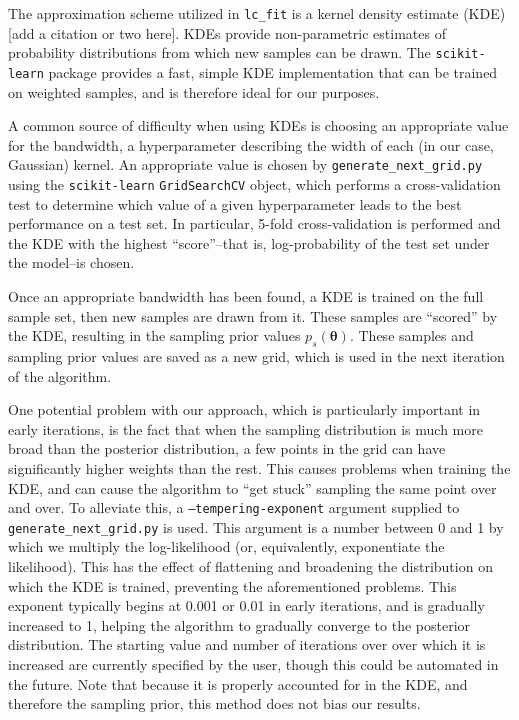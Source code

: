 \documentclass[11pt]{article}
\newcommand\editremark[1]{{\color{red}#1}}
\begin{document}
The approximation scheme utilized in \texttt{lc\_fit} is a kernel density estimate (KDE) \editremark{[add a citation or two here]}. KDEs provide non-parametric estimates of probability distributions from which new samples can be drawn. The \texttt{scikit-learn} package provides a fast, simple KDE implementation that can be trained on weighted samples, and is therefore ideal for our purposes.

A common source of difficulty when using KDEs is choosing an appropriate value for the bandwidth, a hyperparameter describing the width of each (in our case, Gaussian) kernel. An appropriate value is chosen by \texttt{generate\_next\_grid.py} using the \texttt{scikit-learn} \texttt{GridSearchCV} object, which performs a cross-validation test to determine which value of a given hyperparameter leads to the best performance on a test set. In particular, 5-fold cross-validation is performed and the KDE with the highest ``score''--that is, log-probability of the test set under the model--is chosen.

Once an appropriate bandwidth has been found, a KDE is trained on the full sample set, then new samples are drawn from it. These samples are ``scored'' by the KDE, resulting in the sampling prior values $p_s(\bm{\theta})$. These samples and sampling prior values are saved as a new grid, which is used in the next iteration of the algorithm.

One potential problem with our approach, which is particularly important in early iterations, is the fact that when the sampling distribution is much more broad than the posterior distribution, a few points in the grid can have significantly higher weights than the rest. This causes problems when training the KDE, and can cause the algorithm to ``get stuck'' sampling the same point over and over. To alleviate this, a \texttt{--tempering-exponent} argument supplied to \texttt{generate\_next\_grid.py} is used. This argument is a number between 0 and 1 by which we multiply the log-likelihood (or, equivalently, exponentiate the likelihood). This has the effect of flattening and broadening the distribution on which the KDE is trained, preventing the aforementioned problems. This exponent typically begins at 0.001 or 0.01 in early iterations, and is gradually increased to 1, helping the algorithm to gradually converge to the posterior distribution. The starting value and number of iterations over over which it is increased are currently specified by the user, though this could be automated in the future. Note that because it is properly accounted for in the KDE, and therefore the sampling prior, this method does not bias our results.
\end{document}
